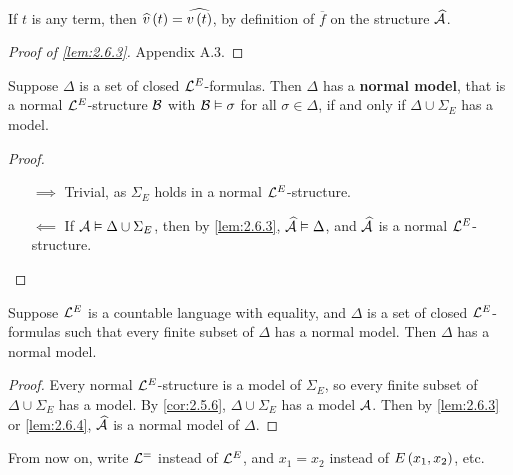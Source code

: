 \begin{note*}
If $ t $ is any term, then $ \widehat{v}\br{t} = \widehat{v\br{t}} $, by definition of $ \overline{f} $ on the structure $ \widehat{\AA} $.
\end{note*}

\begin{proof}[Proof of \ref{lem:2.6.3}]
Appendix A.3.
\end{proof}

\begin{lemma}
\label{lem:2.6.4}
Suppose $ \Delta $ is a set of closed $ \LL^E $-formulas. Then $ \Delta $ has a \textbf{normal model}, that is a normal $ \LL^E $-structure $ \BB $ with $ \BB \vDash \sigma $ for all $ \sigma \in \Delta $, if and only if $ \Delta \cup \Sigma_E $ has a model.
\end{lemma}

\begin{proof}
\hfill
\begin{itemize}
\item[$ \implies $] Trivial, as $ \Sigma_E $ holds in a normal $ \LL^E $-structure.
\item[$ \impliedby $] If $ \AA \vDash \Delta \cup \Sigma_E $, then by \ref{lem:2.6.3}, $ \widehat{\AA} \vDash \Delta $, and $ \widehat{\AA} $ is a normal $ \LL^E $-structure.
\end{itemize}
\end{proof}

\begin{theorem}
Suppose $ \LL^E $ is a countable language with equality, and $ \Delta $ is a set of closed $ \LL^E $-formulas such that every finite subset of $ \Delta $ has a normal model. Then $ \Delta $ has a normal model.
\end{theorem}

\begin{proof}
Every normal $ \LL^E $-structure is a model of $ \Sigma_E $, so every finite subset of $ \Delta \cup \Sigma_E $ has a model. By \ref{cor:2.5.6}, $ \Delta \cup \Sigma_E $ has a model $ \AA $. Then by \ref{lem:2.6.3} or \ref{lem:2.6.4}, $ \widehat{\AA} $ is a normal model of $ \Delta $.
\end{proof}

\begin{notation*}
From now on, write $ \LL^= $ instead of $ \LL^E $, and $ x_1 = x_2 $ instead of $ E\br{x_1, x_2} $, etc.
\end{notation*}

\pagebreak

